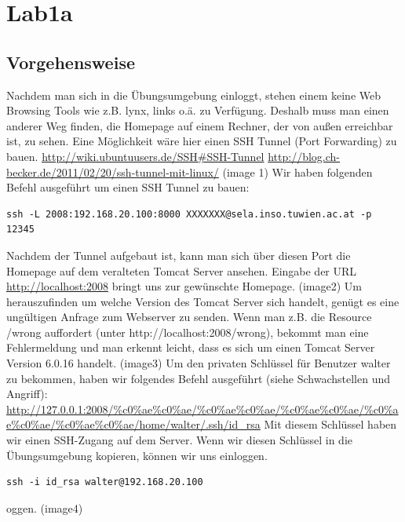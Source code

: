 \documentclass[12pt,a4paper,titlepage,oneside]{scrartcl}
\begin{document}
\maketitle
\setcounter{section}{0}
\setcounter{tocdepth}{2}
\tableofcontents

%
%

\section{Lab1a}

\subsection{Vorgehensweise}
Nachdem man sich in die Übungsumgebung einloggt, stehen einem keine Web Browsing Tools wie z.B. lynx, links o.ä. zu Verfügung. Deshalb muss man einen anderer Weg finden, die Homepage auf einem Rechner, der von außen erreichbar ist, zu sehen. Eine Möglichkeit wäre hier einen SSH Tunnel (Port Forwarding) zu bauen.
\url{http://wiki.ubuntuusers.de/SSH#SSH-Tunnel}
\url{http://blog.ch-becker.de/2011/02/20/ssh-tunnel-mit-linux/}
(image 1)
Wir haben folgenden Befehl ausgeführt um einen SSH Tunnel zu bauen:
\begin{lstlisting}
ssh -L 2008:192.168.20.100:8000 XXXXXXX@sela.inso.tuwien.ac.at -p 12345
\end{lstlisting}
Nachdem der Tunnel aufgebaut ist, kann man sich über diesen Port die Homepage auf dem veralteten Tomcat Server ansehen. Eingabe der URL \url{http://localhost:2008} bringt uns zur gewünschte Homepage.
(image2)
Um herauszufinden um welche Version des Tomcat Server sich handelt, genügt es eine ungültigen Anfrage zum Webserver zu senden. Wenn man z.B. die Resource /wrong auffordert (unter http://localhost:2008/wrong), bekommt man eine Fehlermeldung und man erkennt leicht, dass es sich um einen Tomcat Server Version 6.0.16 handelt.
(image3)
Um den privaten Schlüssel für Benutzer walter zu bekommen, haben wir folgendes Befehl ausgeführt (siehe Schwachstellen und Angriff): \url{http://127.0.0.1:2008/%c0%ae%c0%ae/%c0%ae%c0%ae/%c0%ae%c0%ae/%c0%ae%c0%ae/%c0%ae%c0%ae/home/walter/.ssh/id_rsa}
Mit diesem Schlüssel haben wir einen SSH-Zugang auf dem Server. Wenn wir diesen Schlüssel in die Übungsumgebung kopieren, können wir uns einloggen.
\begin{lstlisting}
ssh -i id_rsa walter@192.168.20.100
\end{lstlisting}
oggen.
(image4)
\end{document}
